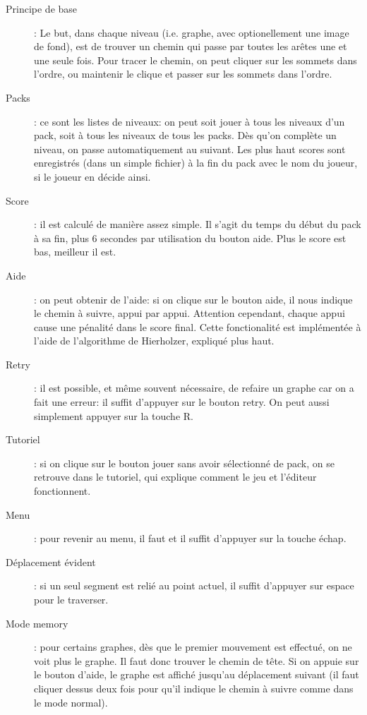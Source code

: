 \documentclass[12pt]{article}
\begin{document}
\begin{description}
    \item[Principe de base]: Le but, dans chaque niveau (i.e. graphe, avec optionellement une image de fond), est de trouver un chemin qui passe par toutes les arêtes une et une seule fois. Pour tracer le chemin, on peut cliquer sur les sommets dans l'ordre, ou maintenir le clique et passer sur les sommets dans l'ordre.

    \item[Packs]: ce sont les listes de niveaux: on peut soit jouer à tous les niveaux d'un pack, soit à tous les niveaux de tous les packs. Dès qu'on complète un niveau, on passe automatiquement au suivant. Les plus haut scores sont enregistrés (dans un simple fichier) à la fin du pack avec le nom du joueur, si le joueur en décide ainsi.

    \item[Score]: il est calculé de manière assez simple. Il s'agit du temps du début du pack à sa fin, plus 6 secondes par utilisation du bouton aide. Plus le score est bas, meilleur il est.

    \item[Aide]: on peut obtenir de l'aide: si on clique sur le bouton aide, il nous indique le chemin à suivre, appui par appui. Attention cependant, chaque appui cause une pénalité dans le score final. Cette fonctionalité est implémentée à l'aide de l'algorithme de Hierholzer, expliqué plus haut.

    \item[Retry]: il est possible, et même souvent nécessaire, de refaire un graphe car on a fait une erreur: il suffit d'appuyer sur le bouton retry. On peut aussi simplement appuyer sur la touche R.

    \item[Tutoriel]: si on clique sur le bouton jouer sans avoir sélectionné de pack, on se retrouve dans le tutoriel, qui explique comment le jeu et l'éditeur fonctionnent.

    \item[Menu]: pour revenir au menu, il faut et il suffit d'appuyer sur la touche échap.

    \item[Déplacement évident]: si un seul segment est relié au point actuel, il suffit d'appuyer sur espace pour le traverser.

    \item[Mode memory]: pour certains graphes, dès que le premier mouvement est effectué, on ne voit plus le graphe. Il faut donc trouver le chemin de tête. Si on appuie sur le bouton d'aide, le graphe est affiché jusqu'au déplacement suivant (il faut cliquer dessus deux fois pour qu'il indique le chemin à suivre comme dans le mode normal).
\end{description}
\end{document}
